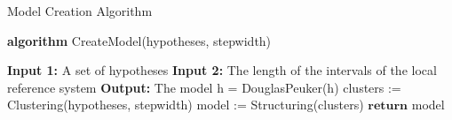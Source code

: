 \documentclass[11pt,twoside,a4paper]{article}
\begin{document}
\begin{algorithm}
\caption{Model Creation Algorithm}\label{aModelCreation}
\textbf{algorithm} CreateModel(hypotheses, stepwidth)
\begin{algorithmic}[1]
\Statex \textbf{Input 1:} A set of hypotheses
\Statex \textbf{Input 2:} The length of the intervals of the local reference system
\Statex \textbf{Output:} The model
\Statex
{} 
\State h = DouglasPeuker(h)
\EndFor
\State clusters := Clustering(hypotheses, stepwidth)
\State model := Structuring(clusters)
\State $\textbf{return}$ model
\end{algorithmic}
\end{algorithm}
\end{document}
